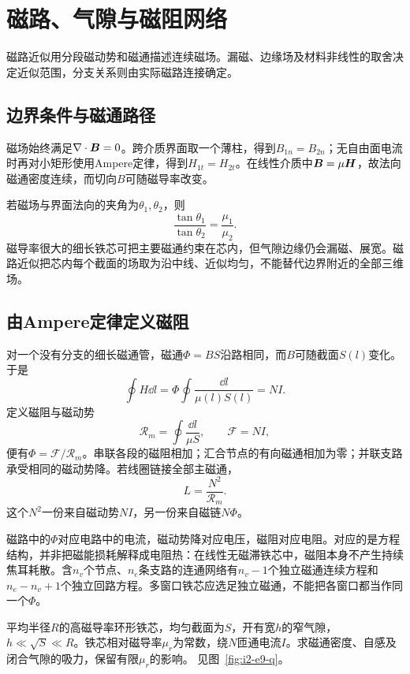 \section{磁路、气隙与磁阻网络}\label{sec:i2-magnetic}
磁路近似用分段磁动势和磁通描述连续磁场。漏磁、边缘场及材料非线性的取舍决定近似范围，分支关系则由实际磁路连接确定。

\subsection{边界条件与磁通路径}
磁场始终满足$\nabla\cdot\bm{B}=0$。跨介质界面取一个薄柱，得到$B_{1n}=B_{2n}$；无自由面电流时再对小矩形使用Ampere定律，得到$H_{1t}=H_{2t}$。在线性介质中$\bm{B}=\mu\bm{H}$，故法向磁通密度连续，而切向$B$可随磁导率改变。

若磁场与界面法向的夹角为$\theta_1,\theta_2$，则
\[\frac{\tan\theta_1}{\tan\theta_2}=\frac{\mu_1}{\mu_2}.
\]
磁导率很大的细长铁芯可把主要磁通约束在芯内，但气隙边缘仍会漏磁、展宽。磁路近似把芯内每个截面的场取为沿中线、近似均匀，不能替代边界附近的全部三维场。

\subsection{由Ampere定律定义磁阻}
对一个没有分支的细长磁通管，磁通$\Phi=BS$沿路相同，而$B$可随截面$S(l)$变化。于是
\[\oint H\dd l=\Phi\oint\frac{\dd l}{\mu(l)S(l)}=NI.
\]
定义磁阻与磁动势
\[\mathcal R_m=\oint\frac{\dd l}{\mu S},\qquad
\mathcal F=NI,
\]
便有$\Phi=\mathcal F/\mathcal R_m$。串联各段的磁阻相加；汇合节点的有向磁通相加为零；并联支路承受相同的磁动势降。若线圈链接全部主磁通，
\[\boxed{L=\frac{N^2}{\mathcal R_m}}.
\]
这个$N^2$一份来自磁动势$NI$，另一份来自磁链$N\Phi$。

磁路中的$\Phi$对应电路中的电流，磁动势降对应电压，磁阻对应电阻。对应的是方程结构，并非把磁能损耗解释成电阻热：在线性无磁滞铁芯中，磁阻本身不产生持续焦耳耗散。含$n_v$个节点、$n_e$条支路的连通网络有$n_v-1$个独立磁通连续方程和$n_e-n_v+1$个独立回路方程。多窗口铁芯应选足独立磁通，不能把各窗口都当作同一个$\Phi$。


\begin{example}[环形铁芯的窄气隙]\label{ex:i2-e9}
平均半径$R$的高磁导率环形铁芯，均匀截面为$S$，开有宽$h$的窄气隙，$h\ll\sqrt S\ll R$。铁芯相对磁导率$\mu_r$为常数，绕$N$匝通电流$I$。求磁通密度、自感及闭合气隙的吸力，保留有限$\mu_r$的影响。 见图~\ref{fig:i2-e9-q}。
\end{example}

